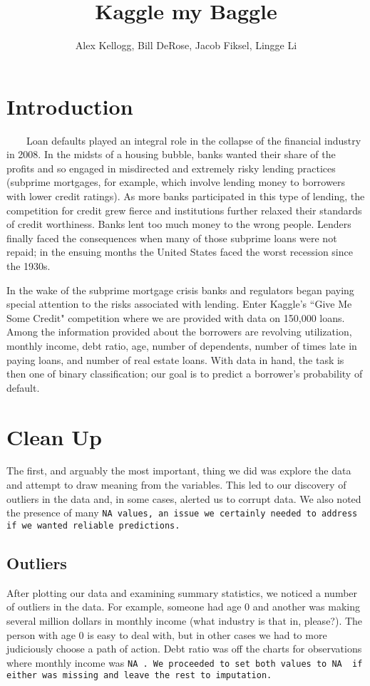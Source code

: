 \documentclass[11pt, oneside]{article}   	%
\title{Kaggle my Baggle}
\author{Alex Kellogg, Bill DeRose, Jacob Fiksel, Lingge Li}
\begin{document}
\maketitle
\section{Introduction}
	 ~~~~Loan defaults played an integral role in the collapse of the financial industry in 2008. 
	In the midsts of a housing bubble, banks wanted their share of the profits and so engaged in
	 misdirected and extremely risky lending practices (subprime mortgages, for example, which involve lending money to borrowers with lower credit ratings). 
	 As more banks participated in this type of lending, the competition for credit grew fierce and
	 institutions further relaxed their standards of credit worthiness. Banks  lent too 
	 much money to the wrong people. Lenders finally faced the consequences when many of 
	 those subprime loans were not repaid;  in the ensuing months the United States faced the 
	 worst recession since the 1930s. 
	 
	 In the wake of the subprime mortgage crisis banks and regulators began paying special 
	 attention to the risks associated with lending. Enter Kaggle's ``Give Me Some Credit" competition where
	 we are provided with data on 150,000 loans. Among the information provided about the 
	 borrowers are revolving utilization, monthly income, debt ratio, age, number
	 of dependents, number of times late in paying loans, and number of real estate loans. 
	 With data in hand, the task is then one of binary classification; our goal is to predict a 
	 borrower's probability of default. 



\section{Clean Up}
	The first, and arguably the most important, thing we did was explore the data and attempt
	to draw meaning from the variables. This led to our discovery of outliers in the data and, in some
	cases, alerted us to corrupt data. We also noted the presence of many \tt NA\rm ~values, an issue we certainly needed to address if we wanted reliable predictions.
	
	
	\subsection{Outliers}
		After plotting our data and examining summary statistics, we noticed a number of outliers in the data. For example, someone had age 0 and another was making several million dollars in monthly income (what industry is that in, please?). The person with age 0 is easy to deal with, but 
		in other cases we had to more judiciously choose a path of action.
		Debt ratio was off the charts for observations
		where monthly income was \tt NA\rm~. We proceeded to set both values to \tt NA\rm~
		if either was missing and leave the rest to imputation.
\end{document}
